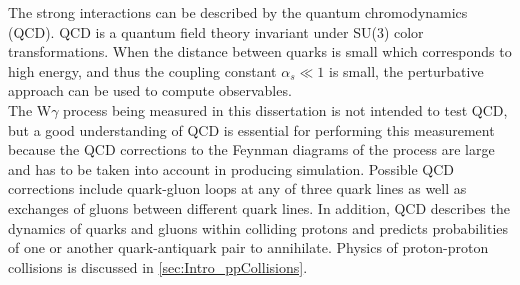 The strong interactions can be described by the quantum chromodynamics (QCD). QCD is a quantum field theory invariant under SU(3) color transformations. When the distance between quarks is small which corresponds to high energy, and thus the coupling constant $\alpha_s \ll 1$ is small, the perturbative approach can be used to compute observables.\\

The W$\gamma$ process being measured in this dissertation is not intended to test QCD, but a good understanding of QCD is essential for performing this measurement because the QCD corrections to the Feynman diagrams of the process are large and has to be taken into account in producing simulation. Possible QCD corrections include quark-gluon loops at any of three quark lines as well as exchanges of gluons between different quark lines. In addition, QCD describes the dynamics of quarks and gluons within colliding protons and predicts probabilities of one or another quark-antiquark pair to annihilate. Physics of proton-proton collisions is discussed in \ref{sec:Intro_ppCollisions}. \\
 
